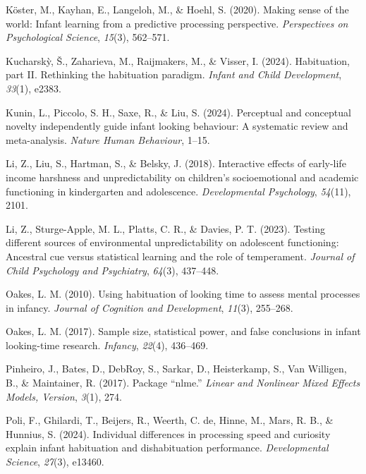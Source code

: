 \documentclass[10pt, letterpaper]{article}
\newenvironment{CSLReferences}%
  {}%
  {\par}
\begin{document}
\begin{CSLReferences}{1}{0}
\leavevmode{}%
Köster, M., Kayhan, E., Langeloh, M., \& Hoehl, S. (2020). Making sense
of the world: Infant learning from a predictive processing perspective.
\emph{Perspectives on Psychological Science}, \emph{15}(3), 562--571.

\leavevmode{}%
Kucharskỳ, Š., Zaharieva, M., Raijmakers, M., \& Visser, I. (2024).
Habituation, part II. Rethinking the habituation paradigm. \emph{Infant
and Child Development}, \emph{33}(1), e2383.

\leavevmode{}%
Kunin, L., Piccolo, S. H., Saxe, R., \& Liu, S. (2024). Perceptual and
conceptual novelty independently guide infant looking behaviour: A
systematic review and meta-analysis. \emph{Nature Human Behaviour},
1--15.

\leavevmode{}%
Li, Z., Liu, S., Hartman, S., \& Belsky, J. (2018). Interactive effects
of early-life income harshness and unpredictability on children's
socioemotional and academic functioning in kindergarten and adolescence.
\emph{Developmental Psychology}, \emph{54}(11), 2101.

\leavevmode{}%
Li, Z., Sturge-Apple, M. L., Platts, C. R., \& Davies, P. T. (2023).
Testing different sources of environmental unpredictability on
adolescent functioning: Ancestral cue versus statistical learning and
the role of temperament. \emph{Journal of Child Psychology and
Psychiatry}, \emph{64}(3), 437--448.

\leavevmode{}%
Oakes, L. M. (2010). Using habituation of looking time to assess mental
processes in infancy. \emph{Journal of Cognition and Development},
\emph{11}(3), 255--268.

\leavevmode{}%
Oakes, L. M. (2017). Sample size, statistical power, and false
conclusions in infant looking-time research. \emph{Infancy},
\emph{22}(4), 436--469.

\leavevmode{}%
Pinheiro, J., Bates, D., DebRoy, S., Sarkar, D., Heisterkamp, S., Van
Willigen, B., \& Maintainer, R. (2017). Package {``nlme.''} \emph{Linear
and Nonlinear Mixed Effects Models, Version}, \emph{3}(1), 274.

\leavevmode{}%
Poli, F., Ghilardi, T., Beijers, R., Weerth, C. de, Hinne, M., Mars, R.
B., \& Hunnius, S. (2024). Individual differences in processing speed
and curiosity explain infant habituation and dishabituation performance.
\emph{Developmental Science}, \emph{27}(3), e13460.


\end{CSLReferences}
\end{document}
